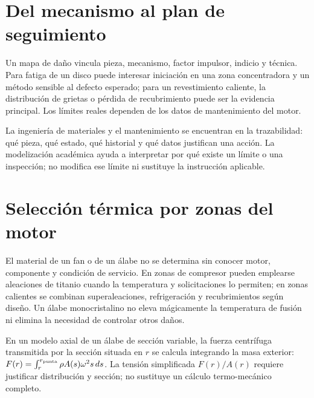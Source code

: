 \section{Del mecanismo al plan de seguimiento}
Un mapa de daño vincula pieza, mecanismo, factor impulsor, indicio y técnica. Para fatiga de un disco puede interesar iniciación en una zona concentradora y un método sensible al defecto esperado; para un revestimiento caliente, la distribución de grietas o pérdida de recubrimiento puede ser la evidencia principal. Los límites reales dependen de los datos de mantenimiento del motor.

La ingeniería de materiales y el mantenimiento se encuentran en la trazabilidad: qué pieza, qué estado, qué historial y qué datos justifican una acción. La modelización académica ayuda a interpretar por qué existe un límite o una inspección; no modifica ese límite ni sustituye la instrucción aplicable.
\section{Selección térmica por zonas del motor}
El material de un fan o de un álabe no se determina sin conocer motor, componente y condición de servicio. En zonas de compresor pueden emplearse aleaciones de titanio cuando la temperatura y solicitaciones lo permiten; en zonas calientes se combinan superaleaciones, refrigeración y recubrimientos según diseño. Un álabe monocristalino no eleva mágicamente la temperatura de fusión ni elimina la necesidad de controlar otros daños.

En un modelo axial de un álabe de sección variable, la fuerza centrífuga transmitida por la sección situada en $r$ se calcula integrando la masa exterior: $F(r)=\int_r^{r_{\rm punta}}\rho A(s)\omega^2 s\,ds$. La tensión simplificada $F(r)/A(r)$ requiere justificar distribución y sección; no sustituye un cálculo termo-mecánico completo.


